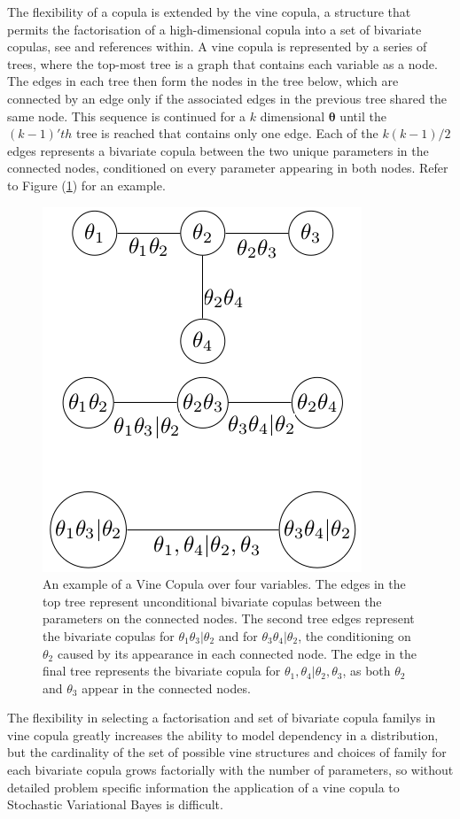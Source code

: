 \documentclass[12pt,a4paper]{article}%
\numberwithin{equation}{section}
\begin{document}
The flexibility of a copula is extended by the vine copula, a structure that permits the factorisation of a high-dimensional copula into a set of bivariate copulas, see \citet{Joe2014} and references within. A vine copula is represented by a series of trees, where the top-most tree is a graph that contains each variable as a node. The edges in each tree then form the nodes in the tree below, which are connected by an edge only if the associated edges in the previous tree shared the same node. This sequence is continued for a $k$ dimensional $\boldsymbol{\theta}$ until the $(k-1)'th$ tree is reached that contains only one edge. Each of the $k(k-1)/2$ edges represents a bivariate copula between the two unique parameters in the connected nodes, conditioned on every parameter appearing in both nodes. Refer to Figure (\ref{fig:vinecop}) for an example.
\vspace{3mm}
\begin{figure}[h]
\centering
\includegraphics[width=0.4\linewidth,height=\textheight,keepaspectratio]{vines.png}
\vspace{2mm}
\caption{An example of a Vine Copula over four variables. The edges in the top tree represent unconditional bivariate copulas between the parameters on the connected nodes. The second tree edges represent the bivariate copulas for $\theta_1 \theta_3 | \theta_2$ and for $\theta_3 \theta_4 | \theta_2$, the conditioning on $\theta_2$ caused by its appearance in each connected node. The edge in the final tree represents the bivariate copula for $\theta_1, \theta_4 | \theta_2, \theta_3$, as both $\theta_2$ and $\theta_3$ appear in the connected nodes.}
\label{fig:vinecop}
\end{figure}


The flexibility in selecting a factorisation and set of bivariate copula familys in vine copula greatly increases the ability to model dependency in a distribution, but the cardinality of the set of possible vine structures and choices of family for each bivariate copula grows factorially with the number of parameters, so without detailed problem specific information the application of a vine copula to Stochastic Variational Bayes is difficult. 
\end{document}
